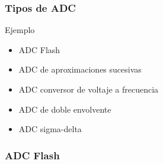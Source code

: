 \documentclass{beamer}
\begin{document}
\begin{frame}
\frametitle{Tipos de ADC}
\begin{exampleblock}{Ejemplo}
\begin{itemize}
\item ADC Flash
\item ADC de aproximaciones sucesivas
\item ADC conversor de voltaje a frecuencia 
\item ADC de doble envolvente 
\item ADC sigma-delta
\end{itemize}
\end{exampleblock}
\end{frame} 

\subsubsection{ADC Flash}
\end{document}
